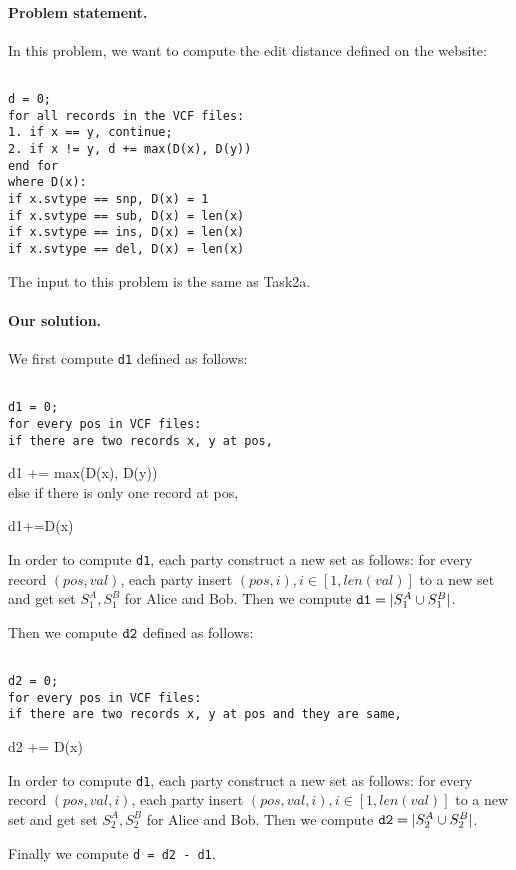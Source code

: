 \paragraph{Problem statement.}
In this problem, we want to compute the edit distance defined on the website:
\begin{framed}
{\tt~\\
d = 0;\\
for all records in the VCF files:\\
1. if x == y, continue;\\
2. if x != y, d += max(D(x), D(y))\\
end for\\
where D(x):\\
if x.svtype == snp, D(x) = 1\\
if x.svtype == sub, D(x) = len(x)\\
if x.svtype == ins, D(x) = len(x)\\
if x.svtype == del, D(x) = len(x)\\
}\end{framed}

The input to this problem is the same as Task2a.
\paragraph{Our solution.}
We first compute {\tt d1} defined as follows:
\begin{framed}
{\tt~\\
d1 = 0;\\
for every pos in VCF files:\\
if there are two records x, y at pos,

d1 += max(D(x), D(y))\\
else if there is only one record at pos,

d1+=D(x)\\}
\end{framed}

In order to compute {\tt d1}, each party construct a new set as follows:  for every record $(pos, val)$,
each party insert $(pos, i), i\in[1, len(val)]$ to a new set and get set $S_1^A, S_1^B$ for Alice and Bob. Then we compute
${\tt d1} = |S_1^A\cup S_1^B|$.

Then we compute ${\tt d2}$ defined as follows:
\begin{framed}
{\tt~\\
d2 = 0;\\
for every pos in VCF files:\\
if there are two records x, y at pos and they are same,

d2 += D(x)\\}
\end{framed}
In order to compute {\tt d1}, each party construct a new set as follows:  for every record $(pos, val, i)$,
each party insert $(pos, val, i), i\in[1, len(val)]$ to a new set and get set $S_2^A, S_2^B$ for Alice and Bob. Then we compute
${\tt d2} = |S_2^A\cup S_2^B|$.


Finally we compute {\tt d = d2 - d1}.
